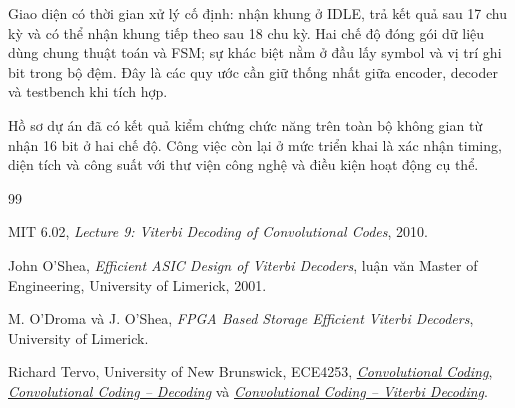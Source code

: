 \documentclass[12pt,a4paper]{article}
\renewcommand{\_}{\originalunderscore\allowbreak}
\renewcommand{\refname}{TÀI LIỆU THAM KHẢO}%
\begin{document}
Giao diện có thời gian xử lý cố định: nhận khung ở IDLE, trả kết quả sau 17 chu kỳ và có thể nhận khung tiếp theo sau 18 chu kỳ. Hai chế độ đóng gói dữ liệu dùng chung thuật toán và FSM; sự khác biệt nằm ở đầu lấy symbol và vị trí ghi bit trong bộ đệm. Đây là các quy ước cần giữ thống nhất giữa encoder, decoder và testbench khi tích hợp.

Hồ sơ dự án đã có kết quả kiểm chứng chức năng trên toàn bộ không gian từ nhận 16 bit ở hai chế độ. Công việc còn lại ở mức triển khai là xác nhận timing, diện tích và công suất với thư viện công nghệ và điều kiện hoạt động cụ thể.

\begin{thebibliography}{99}
\raggedright
\addcontentsline{toc}{section}{\refname}
 MIT 6.02, \emph{Lecture 9: Viterbi Decoding of Convolutional Codes}, 2010.

 John O'Shea, \emph{Efficient ASIC Design of Viterbi Decoders}, luận văn Master of Engineering, University of Limerick, 2001.

 M. O'Droma và J. O'Shea, \emph{FPGA Based Storage Efficient Viterbi Decoders}, University of Limerick.

 Richard Tervo, University of New Brunswick, ECE4253, \href{https://www.ece.unb.ca/tervo/ece4253/convolution1.shtml}{\emph{Convolutional Coding}}, \href{https://www.ece.unb.ca/tervo/ece4253/convolution2.shtml}{\emph{Convolutional Coding -- Decoding}} và \href{https://www.ece.unb.ca/tervo/ece4253/convolution3.shtml}{\emph{Convolutional Coding -- Viterbi Decoding}}.

\end{thebibliography}
\end{document}
